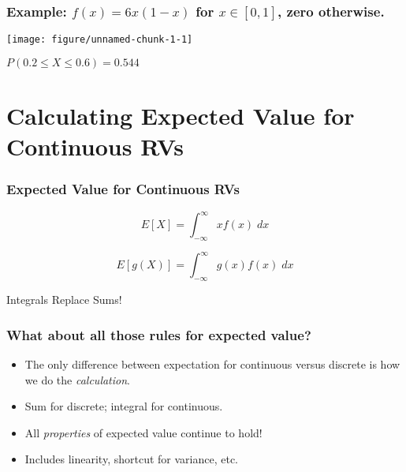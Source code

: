 \begin{frame}[fragile]
  \frametitle{Example: $f(x) = 6x(1-x)$ for $x \in [0,1]$, zero otherwise.}
\begin{knitrout}
\color{fgcolor}
\texttt{[image: figure/unnamed-chunk-1-1]} 

\end{knitrout}

\begin{center}
  \alert{$P(0.2 \leq X \leq 0.6) = 0.544$}
\end{center}
\end{frame}
\section{Calculating Expected Value for Continuous RVs}

\begin{frame}
\frametitle{Expected Value for Continuous RVs}
\[\boxed{E[X] = \int_{-\infty}^\infty x f(x) \; dx}\]

\[\boxed{E[g(X)] = \int_{-\infty}^\infty g(x) f(x) \; dx}\]

\vspace{2em}
\hfill\alert{Integrals Replace Sums!}
\end{frame}

\begin{frame}
\frametitle{What about all those rules for expected value?}
\begin{itemize}
  \item The only difference between expectation for continuous versus discrete is how we do the \emph{calculation}.
  \item Sum for discrete; integral for continuous.
  \item All \emph{properties} of expected value \alert{continue to hold!}
  \item Includes linearity, shortcut for variance, etc.
\end{itemize}
\end{frame}

